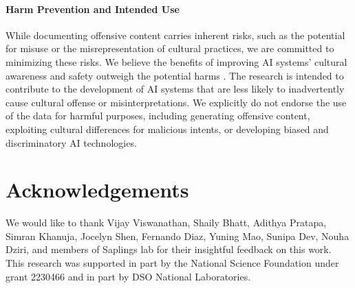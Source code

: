 \paragraph{Harm Prevention and Intended Use} While documenting offensive content carries inherent risks, such as the potential for misuse or the misrepresentation of cultural practices, we are committed to minimizing these risks. We believe the benefits of improving AI systems' cultural awareness and safety outweigh the potential harms \cite{larimore2021reconsidering, ipsos2016attitudes}. The research is intended to contribute to the development of AI systems that are less likely to inadvertently cause cultural offense or misinterpretations. We explicitly do not endorse the use of the data for harmful purposes, including generating offensive content, exploiting cultural differences for malicious intents, or developing biased and discriminatory AI technologies. 

\section*{Acknowledgements}
We would like to thank Vijay Viswanathan, Shaily Bhatt, Adithya Pratapa, Simran Khanuja, Jocelyn Shen, Fernando Diaz, Yuning Mao, 
Sunipa Dev, Nouha Dziri, and members of Saplings lab for their insightful feedback on this work. This research was supported in part by the National Science Foundation under grant 2230466 and in part by DSO National Laboratories. 